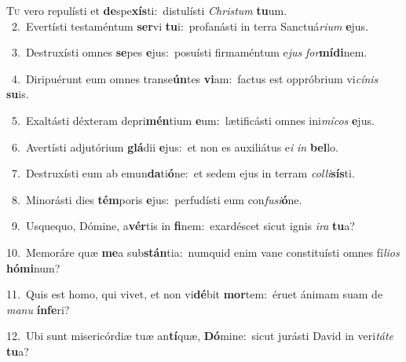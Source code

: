 \lettrine{\initial\textcolor{\initialcolor}{T}}{u} vero repulísti et \textbf{de}\-spe\-\textbf{xís}\-ti:~\star distulísti \textit{Chris}\-\textit{tum} \textbf{tu}\-um.\\
{\numbfont\textcolor{\numbcolor}{~2.}}~Evertísti testaméntum \textbf{ser}\-vi \textbf{tu}\-i:~\star profanásti in terra Sanctuá\-\textit{ri}\-\textit{um} \textbf{e}\-jus.\par
{\numbfont\textcolor{\numbcolor}{~3.}}~Destruxísti omnes \textbf{se}\-pes \textbf{e}\-jus:~\star posuísti firmaméntum e\textit{jus} \textit{for}\-\textbf{mí}\textbf{di}nem.\par
{\numbfont\textcolor{\numbcolor}{~4.}}~Diripuérunt eum omnes transe\-\textbf{ún}\-tes \textbf{vi}\-am:~\star factus est oppróbrium vi\-\textit{cí}\-\textit{nis} \textbf{su}\-is.\par
{\numbfont\textcolor{\numbcolor}{~5.}}~Exaltásti déxteram depri\-\textbf{mén}\-tium \textbf{e}\-um:~\star lætificásti omnes ini\-\textit{mí}\-\textit{cos} \textbf{e}\-jus.\par
{\numbfont\textcolor{\numbcolor}{~6.}}~Avertísti adjutórium \textbf{glá}\-dii \textbf{e}\-jus:~\star et non es auxiliátus e\textit{i} \textit{in} \textbf{bel}\-lo.\par
{\numbfont\textcolor{\numbcolor}{~7.}}~Destruxísti eum ab emun\-\textbf{da}\-ti\-\textbf{ó}\-ne:~\star et sedem ejus in terram \textit{col}\-\textit{li}\textbf{sís}ti.\par
{\numbfont\textcolor{\numbcolor}{~8.}}~Minorásti dies \textbf{tém}\-poris \textbf{e}\-jus:~\star perfudísti eum con\-\textit{fu}\-\textit{si}\textbf{ó}ne.\par
{\numbfont\textcolor{\numbcolor}{~9.}}~Usquequo, Dómine, a\-\textbf{vér}\-tis in \textbf{fi}\-nem:~\star exardéscet sicut ignis \textit{i}\-\textit{ra} \textbf{tu}\-a?\par
{\numbfont\textcolor{\numbcolor}{10.}}~Memoráre quæ \textbf{me}\-a sub\-\textbf{stán}\-tia:~\star numquid enim vane constituísti omnes fí\-\textit{li}\-\textit{os} \textbf{hó}\-\textbf{mi}num?\par
{\numbfont\textcolor{\numbcolor}{11.}}~Quis est homo, qui vivet, et non vi\-\textbf{dé}\-bit \textbf{mor}\-tem:~\star éruet ánimam suam de \textit{ma}\-\textit{nu} \textbf{ín}\-\textbf{fe}ri?\par
{\numbfont\textcolor{\numbcolor}{12.}}~Ubi sunt misericórdiæ tuæ an\-\textbf{tí}\-quæ, \textbf{Dó}\-mine:~\star sicut jurásti David in veri\-\textit{tá}\-\textit{te} \textbf{tu}\-a?\par
